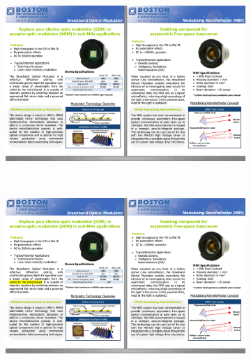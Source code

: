 %
\begin{figure}[!htbp]
	\centering
	\begin{subfigure}[c]{0.5\textwidth}
		\includegraphics[width=\textwidth]{./Img/mems-principle.pdf}
		\caption{}
		\label{fig:mems-principle.pdf}
	\end{subfigure}%
	~%
	\begin{subfigure}[c]{0.5\textwidth}
		\includegraphics[width=\textwidth]{./Img/MRR-TWO-STATE.pdf}
		\caption{}
		\label{fig:MRR-TWO-STATE.pdf}
	\end{subfigure}
	\label{fig:MEMS-MRR-manual}
\end{figure}

